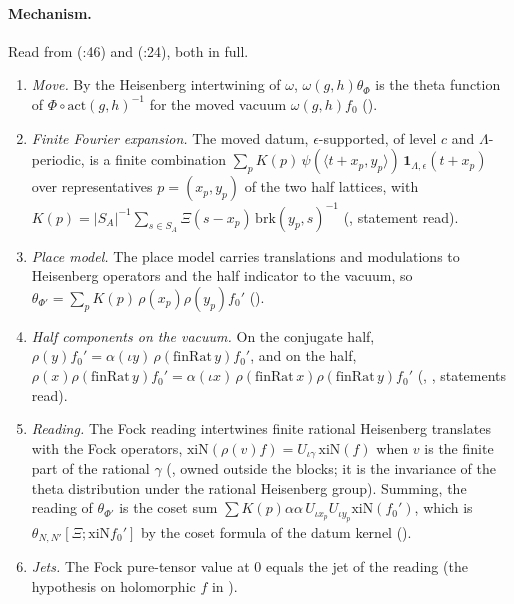 \documentclass[11pt]{article}
\theoremstyle{definition}
\theoremstyle{remark}
\begin{document}
\paragraph{Mechanism.} Read from  (:46) and  (:24), both in full.
\begin{enumerate}[label=(E\arabic*),leftmargin=*,itemsep=2pt]
\item \emph{Move.} By the Heisenberg intertwining of $\omega$, $\omega(g,h)\theta_\Phi$ is the theta function of $\Phi\circ\mathrm{act}(g,h)^{-1}$ for the moved vacuum $\omega(g,h)f_0$ ().
\item \emph{Finite Fourier expansion.} The moved datum, $\epsilon$-supported, of level $c$ and $\Lambda$-periodic, is a finite combination $\sum_pK(p)\,\psi(\langle t+x_p,y_p\rangle)\,\mathbf 1_{\Lambda,\epsilon}(t+x_p)$ over representatives $p=(x_p,y_p)$ of the two half lattices, with $K(p)=\lvert S_A\rvert^{-1}\sum_{s\in S_A}\Xi(s-x_p)\,\mathrm{brk}(y_p,s)^{-1}$ (, statement read).
\item \emph{Place model.} The place model carries translations and modulations to Heisenberg operators and the half indicator to the vacuum, so $\theta_{\Phi'}=\sum_pK(p)\,\rho(x_p)\rho(y_p)f_0'$ ().
\item \emph{Half components on the vacuum.} On the conjugate half, $\rho(y)f_0'=\alpha(\iota y)\,\rho(\mathrm{finRat}\,y)f_0'$, and on the half, $\rho(x)\rho(\mathrm{finRat}\,y)f_0'=\alpha(\iota x)\,\rho(\mathrm{finRat}\,x)\rho(\mathrm{finRat}\,y)f_0'$ (, , statements read).
\item \emph{Reading.} The Fock reading intertwines finite rational Heisenberg translates with the Fock operators, $\mathrm{xiN}(\rho(v)f)=U_{\iota\gamma}\,\mathrm{xiN}(f)$ when $v$ is the finite part of the rational $\gamma$ (, owned outside the blocks; it is the invariance of the theta distribution under the rational Heisenberg group). Summing, the reading of $\theta_{\Phi'}$ is the coset sum $\sum K(p)\alpha\alpha\,U_{\iota x_p}U_{\iota y_p}\mathrm{xiN}(f_0')$, which is $\theta_{N,N'}[\Xi;\mathrm{xiN}f_0']$ by the coset formula of the datum kernel ().
\item \emph{Jets.} The Fock pure-tensor value at $0$ equals the jet of the reading (the hypothesis on holomorphic $f$ in ).
\end{enumerate}
\end{document}

